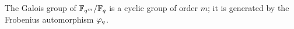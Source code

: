\begin{proposition}
  The Galois group of $\mathbb{F}_{q^m}/\mathbb{F}_q$ is a cyclic group of order $m$;
  it is generated by the Frobenius automorphism $\varphi_q$.
\end{proposition}





